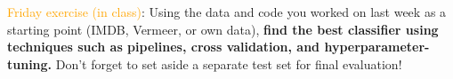 \begin{frame}[standout]
\textcolor{orange}{Friday exercise (in class)}: Using the data and code you worked on last week as a starting point (IMDB, Vermeer, or own data), \textbf{find the best classifier using techniques such as pipelines, cross validation, and hyperparameter-tuning.} Don't forget to set aside a separate test set for final evaluation!
\end{frame}





\begin{frame}
	\printbibliography
\end{frame}




